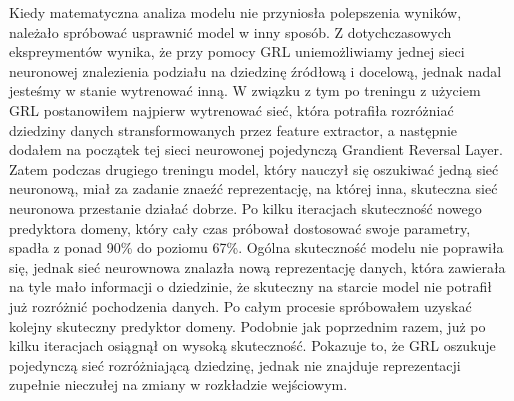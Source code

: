 \documentclass{article}
\begin{document}
\par
Kiedy matematyczna analiza modelu nie przyniosła polepszenia wyników, należało spróbować usprawnić model w inny sposób. Z dotychczasowych ekspreymentów wynika, że przy pomocy GRL uniemożliwiamy jednej sieci neuronowej znalezienia podziału na dziedzinę źródłową i docelową, jednak nadal jesteśmy w stanie wytrenować inną. W związku z tym po treningu z użyciem GRL postanowiłem najpierw wytrenować sieć, która potrafiła rozróżniać dziedziny danych stransformowanych przez feature extractor, a następnie dodałem na początek tej sieci neurowonej pojedynczą Grandient Reversal Layer. Zatem podczas drugiego treningu model, który nauczył się oszukiwać jedną sieć neuronową, miał za zadanie znaeźć reprezentację, na której inna, skuteczna sieć neuronowa przestanie działać dobrze. Po kilku iteracjach skuteczność nowego predyktora domeny, który cały czas próbował dostosować swoje parametry, spadła z ponad 90\% do poziomu 67\%. Ogólna skuteczność modelu nie poprawiła się, jednak sieć neurownowa znalazła nową reprezentację danych, która zawierała na tyle mało informacji o dziedzinie, że skuteczny na starcie model nie potrafił już rozróżnić pochodzenia danych. Po całym procesie spróbowałem uzyskać kolejny skuteczny predyktor domeny. Podobnie jak poprzednim razem, już po kilku iteracjach osiągnął on wysoką skuteczność. Pokazuje to, że GRL oszukuje pojedynczą sieć rozróżniającą dziedzinę, jednak nie znajduje reprezentacji zupełnie nieczułej na zmiany w rozkładzie wejściowym.
\par
\end{document}
